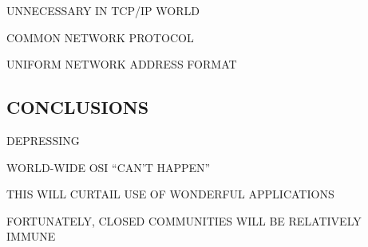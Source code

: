 \begin{bwslide}

\begin{nrtc}
\item	UNNECESSARY IN TCP/IP WORLD
    \begin{nrtc}
    \item	COMMON NETWORK PROTOCOL

    \item	UNIFORM NETWORK ADDRESS FORMAT
    \end{nrtc}
\end{nrtc}
\end{bwslide}


\begin{bwslide}
\part*	{CONCLUSIONS}\bf

\begin{nrtc}
\item	DEPRESSING
    \begin{nrtc}
    \item	WORLD-WIDE OSI ``CAN'T HAPPEN''

    \item	THIS WILL CURTAIL USE OF WONDERFUL APPLICATIONS
    \end{nrtc}

\item	FORTUNATELY, CLOSED COMMUNITIES WILL BE RELATIVELY IMMUNE
\end{nrtc}
\end{bwslide}

